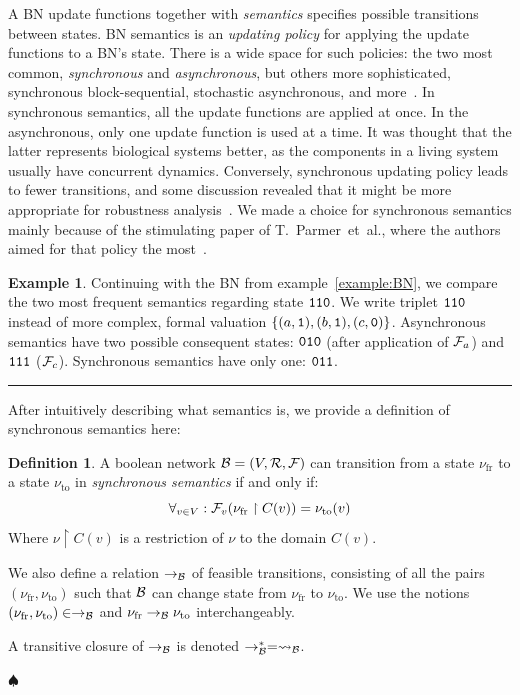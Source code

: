 \documentclass[
	digital, oneside, nosansbold, nocolorbold, nolot, nolof
]{fithesis4}
\theoremstyle{definition}
\newtheorem{definition}{Definition}
\theoremstyle{definition}
\newtheorem{example}{Example}
\newenvironment{ldefinition}
    {\begin{definition}}
	{\par\hspace{\stretch{1}}$\spadesuit$\hspace{\stretch{1}}
     \par\end{definition}}
\newenvironment{lexample}
    {\begin{example}}
    {\par\hspace{\stretch{1}}\rule{0.2\textwidth}{0.01ex}\hspace{\stretch{1}}
     \par\end{example}}
\DeclarePairedDelimiter{\set}{\{}{\}}
\begin{document}
A BN update functions together with \emph{semantics} specifies possible
transitions between states. BN semantics is an \emph{updating policy} for
applying the update functions to a BN's state. There is a wide space for such
policies: the two most common, \emph{synchronous} and \emph{asynchronous}, but
others more sophisticated, synchronous block-sequential, stochastic
asynchronous, and more~\cite{colomoto}. In synchronous semantics, all the
update functions are applied at once. In the asynchronous, only one update
function is used at a time. It was thought that the latter represents
biological systems better, as the components in a living system usually have
concurrent dynamics. Conversely, synchronous updating policy leads to fewer
transitions, and some discussion revealed that it might be more appropriate for
robustness analysis~\cite{concepts_bn}. We made a choice for synchronous
semantics mainly because of the stimulating paper of T.~Parmer~et~al., where
the authors aimed for that policy the most~\cite{infl_max_BN}.

\begin{lexample}
Continuing with the BN from example~\ref{example:BN}, we compare the two most
frequent semantics regarding state $\mathtt{110}$. We write triplet
$\mathtt{110}$ instead of more complex, formal valuation $\set{(a, \state{1}),
(b, \state{1}), (c, \state{0})}$. Asynchronous semantics have two possible
consequent states: $\mathtt{010}$ (after application of $\mathcal{F}_a$) and
$\mathtt{111}$ ($\mathcal{F}_c$).  Synchronous semantics have only one:
$\mathtt{011}$.
\end{lexample}

After intuitively describing what semantics is, we provide a definition of
synchronous semantics here:
\begin{ldefinition}
A boolean network $\mathcal{B} = (V, \mathcal{R}, \mathcal{F})$ can transition from a
state $\nu_{\text{fr}}$ to a state $\nu_{\text{to}}$ in \emph{synchronous
semantics} if and only if:
\[
    \forall_{v \in V} : \mathcal{F}_v(\nu_{\text{fr}}\restriction C(v)) =
    \nu_{\text{to}}(v)
\]
Where $\nu\restriction C(v)$ is a restriction of $\nu$ to the domain $C(v)$.

We also define a relation $\to_{\mathcal{B}}$ of feasible transitions, consisting of
all the pairs $(\nu_{\text{fr}}, \nu_{\text{to}})$ such that $\mathcal{B}$
can change state from $\nu_{\text{fr}}$ to $\nu_{\text{to}}$. We use the notions
$(\nu_{\text{fr}}, \nu_{\text{to}}) \in \to_{\mathcal{B}}$ and
$\nu_{\text{fr}} \to_{\mathcal{B}} \nu_{\text{to}}$ interchangeably.

A transitive closure of $\to_{\mathcal{B}}$ is denoted $\to_{\mathcal{B}}^* = \rightsquigarrow_{\mathcal{B}}$.
\end{ldefinition}
\end{document}

